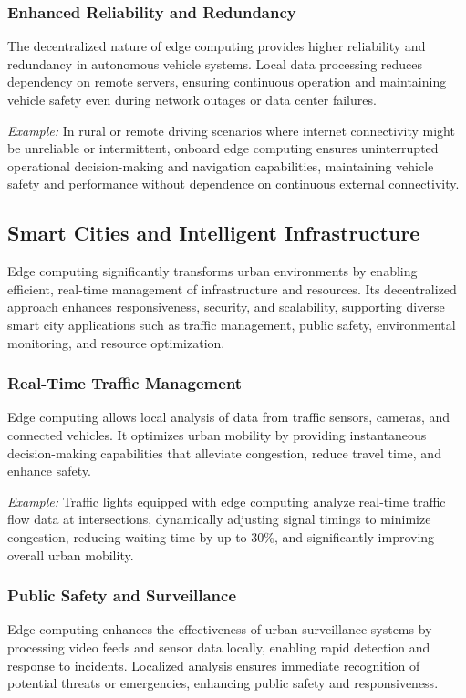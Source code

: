 \documentclass[runningheads]{llncs}
\begin{document}
\subsubsection{Enhanced Reliability and Redundancy}
The decentralized nature of edge computing provides higher reliability and redundancy in autonomous vehicle systems. Local data processing reduces dependency on remote servers, ensuring continuous operation and maintaining vehicle safety even during network outages or data center failures.

\textit{Example:} In rural or remote driving scenarios where internet connectivity might be unreliable or intermittent, onboard edge computing ensures uninterrupted operational decision-making and navigation capabilities, maintaining vehicle safety and performance without dependence on continuous external connectivity.

\subsection{Smart Cities and Intelligent Infrastructure}

Edge computing significantly transforms urban environments by enabling efficient, real-time management of infrastructure and resources. Its decentralized approach enhances responsiveness, security, and scalability, supporting diverse smart city applications such as traffic management, public safety, environmental monitoring, and resource optimization.

\subsubsection{Real-Time Traffic Management}
Edge computing allows local analysis of data from traffic sensors, cameras, and connected vehicles. It optimizes urban mobility by providing instantaneous decision-making capabilities that alleviate congestion, reduce travel time, and enhance safety.

\textit{Example:} Traffic lights equipped with edge computing analyze real-time traffic flow data at intersections, dynamically adjusting signal timings to minimize congestion, reducing waiting time by up to 30\%, and significantly improving overall urban mobility.

\subsubsection{Public Safety and Surveillance}
Edge computing enhances the effectiveness of urban surveillance systems by processing video feeds and sensor data locally, enabling rapid detection and response to incidents. Localized analysis ensures immediate recognition of potential threats or emergencies, enhancing public safety and responsiveness.
\end{document}

